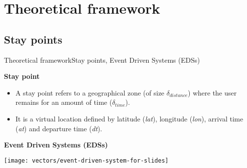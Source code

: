 \section{Theoretical framework}
\subsection{Stay points}
\begin{frame}{Theoretical framework}{Stay points, Event Driven Systems (EDSs)}
\small
\begin{block}{\small \textbf{Stay point}}
\begin{itemize}
  \item A stay point refers to a geographical zone (of size $\delta_{distance}$) where the user remains for an amount of time ($\delta_{time}$).
  \item It is a virtual location defined by latitude (\emph{lat}), longitude (\emph{lon}), arrival time (\emph{at}) and departure time (\emph{dt}).
\end{itemize}
\end{block}

\begin{block}{\small \textbf{Event Driven Systems (EDSs)}}
{
    \centering
    \texttt{[image: vectors/event-driven-system-for-slides]}
    \par
}
\end{block}




\end{frame}
